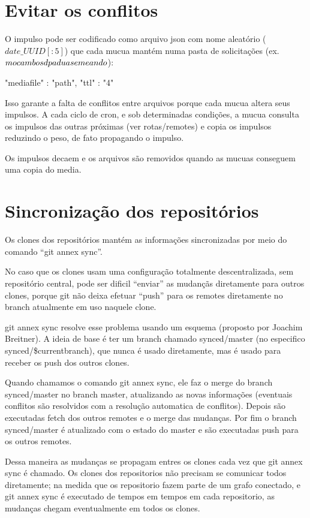 \section{Evitar os conflitos}

O impulso pode ser codificado como arquivo json com nome aleatório
($date\_UUID[:5]$) que cada mucua mantém numa pasta de solicitações
(ex. $mocambos\/dpadua\/semeando\/$):

\begin{code}
  {"mediafile" : "path", "ttl" : "4" } 
\end{code} 

Isso garante a falta de conflitos entre arquivos porque cada mucua
altera seus impulsos. A cada ciclo de cron, e sob determinadas
condições, a mucua consulta os impulsos das outras próximas (ver
rotas/remotes) e copia os impulsos reduzindo o peso, de fato
propagando o impulso.

Os impulsos decaem e os arquivos são removidos quando as mucuas
conseguem uma copia do media.  



\section{Sincronização dos repositórios}
Os clones dos repositórios mantém as informações sincronizadas por
meio do comando ``git annex sync''.

No caso que os clones usam uma configuração totalmente
descentralizada, sem repositório central, pode ser dificil ``enviar''
as mudançãs diretamente para outros clones, porque git não deixa
efetuar ``push'' para os remotes diretamente no branch atualmente em
uso naquele clone.

git annex sync resolve esse problema usando um esquema (proposto por
Joachim Breitner). A ideia de base é ter um branch chamado
synced/master (no especifico synced/\$currentbranch), que nunca é
usado diretamente, mas é usado para receber os push dos outros clones.

Quando chamamos o comando git annex sync, ele faz o merge do branch
synced/master no branch master, atualizando as novas informações
(eventuais conflitos são resolvidos com a resolução automatica de
conflitos). Depois são executadas fetch dos outros remotes e o merge
das mudanças. Por fim o branch synced/master é atualizado com o estado
do master e são executadas push para os outros remotes.

Dessa maneira as mudanças se propagam entres os clones cada vez que
git annex sync é chamado. Os clones dos repositorios não precisam se
comunicar todos diretamente; na medida que os repositorio fazem parte
de um grafo conectado, e git annex sync é executado de tempos em
tempos em cada repositorio, as mudanças chegam eventualmente em todos
os clones.


